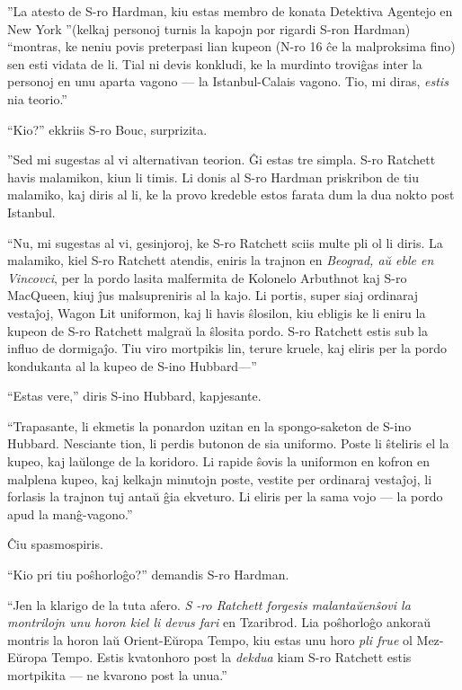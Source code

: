 ''La atesto de S-ro Hardman, kiu estas membro de konata Detektiva Agentejo en New York ''(kelkaj personoj turnis la kapojn por rigardi S-ron Hardman) ``montras, ke neniu povis preterpasi lian kupeon (N-ro 16 ĉe la malproksima fino) sen esti vidata de li. Tial ni devis konkludi, ke la murdinto troviĝas inter la personoj en unu aparta vagono --- la Istanbul-Calais vagono. Tio, mi diras, \emph{estis} nia teorio.''

``Kio?'' ekkriis S-ro Bouc, surprizita.

''Sed mi sugestas al vi alternativan teorion. Ĝi estas tre simpla. S-ro Ratchett havis malamikon, kiun li timis. Li donis al S-ro Hardman priskribon de tiu malamiko, kaj diris al li, ke la provo kredeble estos farata dum la dua nokto post Istanbul.

``Nu, mi sugestas al vi, gesinjoroj, ke S-ro Ratchett sciis multe pli ol li diris. La malamiko, kiel S-ro Ratchett atendis, eniris la trajnon en \emph{Beograd, aŭ eble en Vincovci}, per la pordo lasita malfermita de Kolonelo Arbuthnot kaj S-ro MacQueen, kiuj ĵus malsupreniris al la kajo. Li portis, super siaj ordinaraj vestaĵoj, Wagon Lit uniformon, kaj li havis ŝlosilon, kiu ebligis ke li eniru la kupeon de S-ro Ratchett malgraŭ la ŝlosita pordo. S-ro Ratchett estis sub la influo de dormigaĵo. Tiu viro mortpikis lin, terure kruele, kaj eliris per la pordo kondukanta al la kupeo de S-ino Hubbard---''

``Estas vere,'' diris S-ino Hubbard, kapjesante.

``Trapasante, li ekmetis la ponardon uzitan en la spongo-saketon de S-ino Hubbard. Nesciante tion, li perdis butonon de sia uniformo. Poste li ŝteliris el la kupeo, kaj laŭlonge de la koridoro. Li rapide ŝovis la uniformon en kofron en malplena kupeo, kaj kelkajn minutojn poste, vestite per ordinaraj vestaĵoj, li forlasis la trajnon tuj antaŭ ĝia ekveturo. Li eliris per la sama vojo --- la pordo apud la manĝ-vagono.''

Ĉiu spasmospiris.

``Kio pri tiu poŝhorloĝo?'' demandis S-ro Hardman.

``Jen la klarigo de la tuta afero. \emph{S -ro Ratchett forgesis malantaŭenŝovi la montrilojn unu horon kiel li devus fari} en Tzaribrod. Lia poŝhorloĝo ankoraŭ montris la horon laŭ Orient-Eŭropa Tempo, kiu estas unu horo \emph{pli frue} ol Mez-Eŭropa Tempo. Estis kvatonhoro post la \emph{dekdua} kiam S-ro Ratchett estis mortpikita --- ne kvarono post la unua.''

